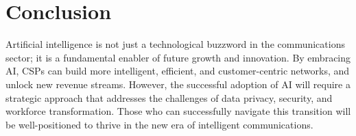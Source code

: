 \section{Conclusion}

Artificial intelligence is not just a technological buzzword in the communications sector; it is a fundamental enabler of future growth and innovation. By embracing AI, CSPs can build more intelligent, efficient, and customer-centric networks, and unlock new revenue streams. However, the successful adoption of AI will require a strategic approach that addresses the challenges of data privacy, security, and workforce transformation. Those who can successfully navigate this transition will be well-positioned to thrive in the new era of intelligent communications.